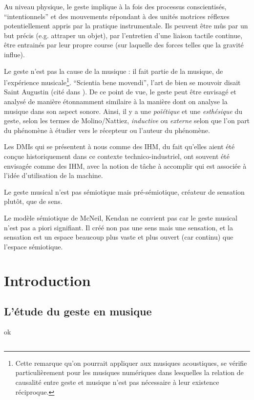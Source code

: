 Au niveau physique, le geste implique à la fois des processus conscientisés, ``intentionnels'' et des mouvements répondant à des unités motrices réflexes potentiellement appris par la pratique instrumentale. Ils peuvent être mûs par un but précis (e.g. attraper un objet), par l'entretien d'une liaison tactile continue, être entrainés par leur propre course (sur laquelle des forces telles que la gravité influe).


Le geste n'est pas la cause de la musique : il fait partie de la musique, de l'expérience musicale\footnote{Cette remarque qu'on pourrait appliquer aux musiques acoustiques, se vérifie particulièrement pour les musiques numériques dans lesquelles la relation de causalité entre geste et musique n'est pas nécessaire à leur existence réciproque.}. ``Scientia bene movendi'', l'art de bien se mouvoir disait Saint Augustin (cité dans \cite{delalande_geste_1988}). De ce point de vue, le geste peut être envisagé et analysé de manière étonnamment similaire à la manière dont on analyse la musique dans son aspect sonore. Ainsi, il y a une \textit{poïétique} et une \textit{esthésique} du geste, selon les termes de Molino/Nattiez, \textit{inductive} ou \textit{externe} selon que l'on part du phénomène à étudier vers le récepteur ou l'auteur du phénomène. 

Les DMIs qui se présentent à nous comme des IHM, du fait qu'elles aient été conçue historiquement dans ce contexte technico-industriel, ont souvent été envisagée comme des IHM, avec la notion de tâche à accomplir qui est associée à l'idée d'utilisation de la machine.

Le geste musical n'est pas sémiotique mais pré-sémiotique, créateur de sensation plutôt, que de sens.


Le modèle sémiotique de McNeil, Kendan ne convient pas car le geste musical n'est pas a piori signifiant. Il créé non pas une sens mais une sensation, et la sensation est un espace beaucoup plus vaste et plus ouvert (car continu) que l'espace sémiotique.

\section{Introduction}
	\subsection{L'étude du geste en musique}
		ok
	\subsection{ }
